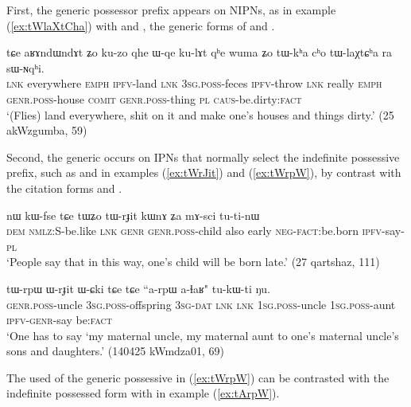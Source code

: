 First, the generic possessor prefix appears on NIPNs, as in example (\ref{ex:tWlaXtCha}) with  and , the generic forms of  and .

\begin{exe}
\ex \label{ex:tWlaXtCha}
\gll tɕe  	aʁɤndɯndɤt  	ʑo  	ku-zo  	qhe  	ɯ-qe  	ku-lɤt  	qʰe	wuma  ʑo  	tɯ-kʰa  	cʰo  	tɯ-laχtɕʰa  	ra  	sɯ-ɴqʰi.  \\
\textsc{lnk} everywhere \textsc{emph} \textsc{ipfv}-land \textsc{lnk} \textsc{3sg.poss}-feces \textsc{ipfv}-throw \textsc{lnk} really \textsc{emph} \textsc{genr.poss}-house \textsc{comit} \textsc{genr.poss}-thing \textsc{pl} \textsc{caus}-be.dirty:\textsc{fact} \\
\glt `(Flies) land everywhere, shit on it and make one's houses and things dirty.' (25 akWzgumba, 59)
\end{exe}

Second, the generic  occurs on IPNs that normally select the  indefinite possessive prefix, such as  and  in examples (\ref{ex:tWrJit}) and (\ref{ex:tWrpW}), by contrast with the citation forms   and .

\begin{exe}
\ex \label{ex:tWrJit}
\gll nɯ 	kɯ-fse 	tɕe 	tɯʑo 	tɯ-rɟit 	kɯnɤ 	ʑa 	mɤ-sci 	tu-ti-nɯ \\
\textsc{dem} \textsc{nmlz}:S-be.like \textsc{lnk} \textsc{genr} \textsc{genr.poss}-child also early \textsc{neg-fact}:be.born \textsc{ipfv}-say-\textsc{pl} \\
\glt `People say that in this way, one's child will be born late.' (27 qartshaz, 111)
\end{exe}

\begin{exe}
\ex \label{ex:tWrpW}
\gll  tɯ-rpɯ 	ɯ-rɟit 	ɯ-ɕki 	tɕe 	tɕe 	``a-rpɯ a-ɬaʁ" 	tu-kɯ-ti 	ŋu. \\
\textsc{genr.poss}-uncle \textsc{3sg.poss}-offspring \textsc{3sg-dat} \textsc{lnk} \textsc{lnk} \textsc{1sg.poss}-uncle \textsc{1sg.poss}-aunt \textsc{ipfv-genr}-say  be:\textsc{fact} \\
\glt `One has to say `my maternal uncle, my maternal aunt to one's maternal uncle's sons and daughters.' (140425 kWmdza01, 69)
\end{exe}

The used of the generic possessive  in (\ref{ex:tWrpW}) can be contrasted with the indefinite possessed form with  in example (\ref{ex:tArpW}).

